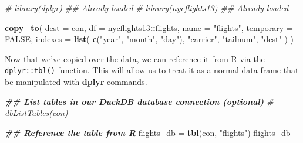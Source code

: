 \documentclass[
]{article}
\newenvironment{Shaded}{\begin{snugshade}}{\end{snugshade}}
\newcommand{\AttributeTok}[1]{\textcolor[rgb]{0.13,0.29,0.53}{#1}}
\newcommand{\CommentTok}[1]{\textcolor[rgb]{0.56,0.35,0.01}{\textit{#1}}}
\newcommand{\ConstantTok}[1]{\textcolor[rgb]{0.56,0.35,0.01}{#1}}
\newcommand{\DocumentationTok}[1]{\textcolor[rgb]{0.56,0.35,0.01}{\textbf{\textit{#1}}}}
\newcommand{\FunctionTok}[1]{\textcolor[rgb]{0.13,0.29,0.53}{\textbf{#1}}}
\newcommand{\NormalTok}[1]{#1}
\newcommand{\OtherTok}[1]{\textcolor[rgb]{0.56,0.35,0.01}{#1}}
\newcommand{\SpecialCharTok}[1]{\textcolor[rgb]{0.81,0.36,0.00}{\textbf{#1}}}
\newcommand{\StringTok}[1]{\textcolor[rgb]{0.31,0.60,0.02}{#1}}
\begin{document}
\begin{Shaded}
\begin{Highlighting}[]
\CommentTok{\# library(dplyr)        \#\# Already loaded}
\CommentTok{\# library(nycflights13) \#\# Already loaded}

\FunctionTok{copy\_to}\NormalTok{(}
  \AttributeTok{dest =}\NormalTok{ con, }
  \AttributeTok{df =}\NormalTok{ nycflights13}\SpecialCharTok{::}\NormalTok{flights, }
  \AttributeTok{name =} \StringTok{"flights"}\NormalTok{,}
  \AttributeTok{temporary =} \ConstantTok{FALSE}\NormalTok{, }
  \AttributeTok{indexes =} \FunctionTok{list}\NormalTok{(}
    \FunctionTok{c}\NormalTok{(}\StringTok{"year"}\NormalTok{, }\StringTok{"month"}\NormalTok{, }\StringTok{"day"}\NormalTok{), }
    \StringTok{"carrier"}\NormalTok{, }
    \StringTok{"tailnum"}\NormalTok{,}
    \StringTok{"dest"}
\NormalTok{    )}
\NormalTok{  )}
\end{Highlighting}
\end{Shaded}

Now that we've copied over the data, we can reference it from R via the
\texttt{dplyr::tbl()} function. This will allow us to treat it as a
normal data frame that be manipulated with \textbf{dplyr} commands.

\begin{Shaded}
\begin{Highlighting}[]
\DocumentationTok{\#\# List tables in our DuckDB database connection (optional)}
\CommentTok{\# dbListTables(con)}

\DocumentationTok{\#\# Reference the table from R}
\NormalTok{flights\_db }\OtherTok{=} \FunctionTok{tbl}\NormalTok{(con, }\StringTok{"flights"}\NormalTok{)}
\NormalTok{flights\_db}
\end{Highlighting}
\end{Shaded}
\end{document}
